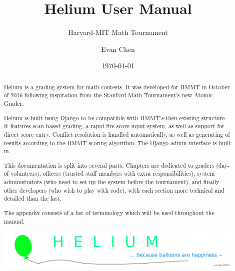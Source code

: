 \documentclass[11pt]{scrreprt}
\begin{document}
\title{Helium User Manual}
\subtitle{Harvard-MIT Math Tournament}
\author{Evan Chen}
\date{\today}
\maketitle

\begin{abstract}
	Helium is a grading system for math contests.
	It was developed for HMMT in October of 2016 following inspiration
	from the Stanford Math Tournament's new Atomic Grader.

	Helium is built using Django to be compatible with
	HMMT's then-existing structure.
	It features scan-based grading, a rapid-fire score input system,
	as well as support for direct score entry.
	Conflict resolution is handled automatically,
	as well as generating of results according to the
	HMMT scoring algorithm.
	The Django admin interface is built in.

	This documentation is split into several parts.
	Chapters are dedicated to graders (day-of volunteers),
	officers (trusted staff members with extra responsibilities),
	system administrators (who need to set up the system before the tournament),
	and finally other developers (who wish to play with code),
	with each section more technical and detailed than the last.

	The appendix consists of a list of terminology which
	will be used throughout the manual.

	\begin{center}
		\includegraphics[width=0.99\textwidth]{../img/balloons.png}
	\end{center}
\end{abstract}

\tableofcontents






\appendix


\end{document}
